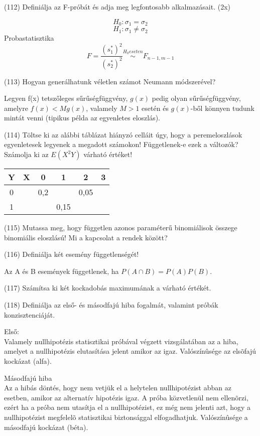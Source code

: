 \documentclass[12p]{article}
\begin{document}
(112) Definiálja az F-próbát és adja meg legfontosabb alkalmazásait. (2x)

$$H_0: \sigma_1 = \sigma_2$$
$$H_1: \sigma_1 \neq \sigma_2$$
Probastatisztika
$$F= \frac{(s_1^{*})^2}{(s_2^{*})^2} \stackrel{H_0 eseten}{\sim} F_{n-1,m-1}$$

(113)  Hogyan generálhatunk véletlen számot Neumann módszerével?

Legyen f(x) tetszőleges sűrűségfüggvény, $g(x)$ pedig olyan sűrűségfüggvény, amelyre $f(x) < Mg(x)$, valamely $M>1$ esetén és $g(x)$-ből könnyen tudunk mintát venni (tipikus példa az egyenletes eloszlás).

(114) Töltse ki az alábbi táblázat hiányzó celláit úgy, hogy a peremeloszlások egyenletesek
legyenek a megadott számokon! Függetlenek-e ezek a változók? Számolja ki az $E(X^2Y)$ várható értéket!

\begin{center}
 \begin{tabular}{| c c || c | c | c | c |} 
 \hline
 Y & X &  0 & 1 & 2 & 3\\ [0.5ex] 
 \hline\hline
 0 &  & 0,2 & & 0,05 & \\ 
 \hline
 1 &  & & 0,15 & & \\
 \hline\hline
\end{tabular}
\end{center}

(115) Mutassa meg, hogy független azonos paraméterű binomiálisok összege binomiális eloszlású! Mi a kapcsolat a rendek között?

(116) Definiálja két esemény függetlenségét!

Az A és B események függetlenek, ha $P(A \cap B) = P(A)P(B)$.

(117) Számítsa ki két kockadobás maximumának a várható értékét.

(118) Definiálja az első- és másodfajú hiba fogalmát, valamint próbák konzisztenciáját.

Első:\\
Valamely nullhipotézis statisztikai próbával végzett vizsgálatában az a hiba, amelyet a nullhipotézis elutasítása jelent amikor az igaz. Valószínûsége az elsõfajú kockázat (alfa). 

Másodfajú hiba\\
Az a hibás döntés, hogy nem vetjük el a helytelen nullhipotézist abban az esetben, amikor az alternatív hipotézis igaz. A próba közvetlenül nem ellenõrzi, ezért ha a próba nem utasítja el a nullhipotézist, ez még nem jelenti azt, hogy a nullhipotézist megfelelõ statisztikai biztonsággal elfogadhatjuk. Valószínûsége a másodfajú kockázat (béta). 
\end{document}
